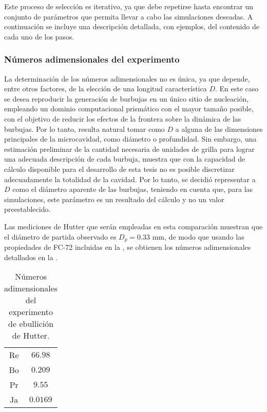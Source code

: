 Este proceso de selecci\'on es iterativo, ya que debe repetirse hasta encontrar un conjunto de par\'ametros que permita llevar a cabo las simulaciones deseadas. A continuaci\'on se incluye una descripci\'on detallada, con ejemplos, del contenido de cada uno de los pasos.


\subsubsection{N\'umeros adimensionales del experimento}

La determinaci\'on de los n\'umeros adimensionales no es \'unica, ya que depende, entre otros factores, de la elecci\'on de una longitud caracter\'istica $D$. En este caso se desea reproducir la generaci\'on de burbujas en un \'unico sitio de nucleaci\'on, empleando un dominio computacional prism\'atico con el mayor tama\~no posible, con el objetivo de reducir los efectos de la frontera sobre la din\'amica de las burbujas. Por lo tanto, resulta natural tomar como $D$ a alguna de las dimensiones principales de la microcavidad, como di\'ametro o profundidad. Sin embargo, una estimaci\'on preliminar de la cantidad necesaria de unidades de grilla para lograr una adecuada descripci\'on de cada burbuja, muestra que con la capacidad de c\'alculo disponible para el desarrollo de esta tesis no es posible discretizar adecuadamente la totalidad de la cavidad. Por lo tanto, se decidi\'o representar a $D$ como el di\'ametro aparente de las burbujas, teniendo en cuenta que, para las simulaciones, este par\'ametro es un resultado del c\'alculo y no un valor preestablecido.

Las mediciones de Hutter que ser\'an empleadas en esta comparaci\'on muestran que el di\'ametro de partida observado es $D_p=0.33$ mm, de modo que usando las propiedades de FC-72 incluidas en la , se obtienen los n\'umeros adimensionales detallados en la .
\begin{table}[ht]
	\centering
    \begin{tabular}{c c}
	    \toprule
		Re & $66.98$  \\
		Bo & $0.209$  \\
		Pr & $9.55$   \\
		Ja & $0.0169$ \\
        \bottomrule
	\end{tabular}
	\caption{N\'umeros adimensionales del experimento de ebullici\'on de Hutter.}
	\label{tab:exp_adim}
\end{table} 


